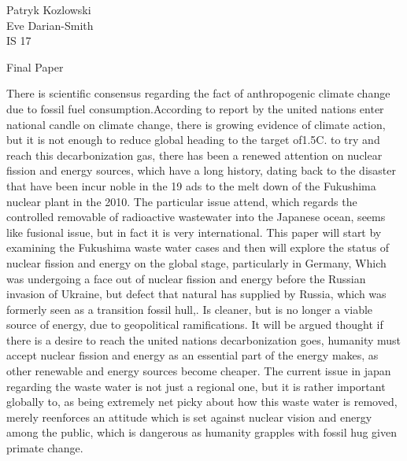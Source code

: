 \documentclass[12pt,letterpaper]{article}
\renewcommand{\maketitle}{\makemlaheader}
\renewcommand{\maketitle}{\makemlaheader}
\newcommand{\makemlaheader}{
Patryk Kozlowski \\
Eve Darian-Smith\\
IS 17\\
\begin{center}\textnormal{Final Paper}\end{center}

}
\begin{document}
\begin{flushleft}

\setlength{\parindent}{0.5in}

\maketitle
There is scientific consensus regarding the fact of anthropogenic climate change due to fossil fuel consumption.According to report by the united nations enter national candle on climate change, there is growing evidence of climate action, but it is not enough to reduce global heading to the target of1.5C. to try and reach this decarbonization gas, there has been a renewed attention on nuclear fission and energy sources, which have a long history, dating back to the disaster that have been incur noble in the 19 ads to the melt down of the Fukushima nuclear plant in the 2010. The particular issue attend, which regards the controlled removable of radioactive wastewater into the Japanese ocean, seems like fusional issue, but in fact it is very international. This paper will start by examining the Fukushima waste water cases and then will explore the status of nuclear fission and energy on the global stage, particularly in Germany, Which was undergoing a face out of nuclear fission and energy before the Russian invasion of Ukraine, but defect that natural has supplied by Russia, which was formerly seen as a transition fossil hull,. Is cleaner, but is no longer a viable source of energy, due to geopolitical ramifications. It will be argued thought if there is a desire to reach the united nations decarbonization goes, humanity must accept nuclear fission and energy as an essential part of the energy makes, as other renewable and energy sources become cheaper. The current issue in japan regarding the waste water is not just a regional one, but it is rather important globally to, as being extremely net picky about how this waste water is removed, merely reenforces an attitude which is set against nuclear vision and energy among the public, which is dangerous as humanity grapples with fossil hug given primate change.


\end{flushleft}
\end{document}
